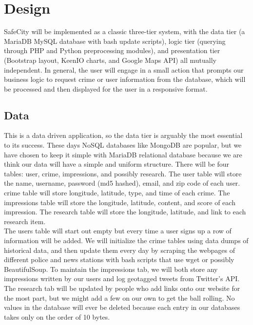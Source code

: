 \documentclass[paper=a4, fontsize=11pt]{scrartcl} %
\numberwithin{equation}{section} %
\numberwithin{figure}{section} %
\numberwithin{table}{section} %
\begin{document}

\section{Design}

SafeCity will be implemented as a classic three-tier system, with the data tier (a MariaDB MySQL database with bash update scripts), logic tier (querying through PHP and Python preprocessing modules), and presentation tier (Bootstrap layout, KeenIO charts, and Google Maps API) all mutually independent. In general, the user will engage in a small action that prompts our business logic to request crime or user information from the database, which will be processed and then displayed for the user in a responsive format. \\


\subsection{Data}

This is a data driven application, so the data tier is arguably the most essential to its success. These days NoSQL databases like MongoDB are popular, but we have chosen to keep it simple with MariaDB relational database because we are think our data will have a simple and uniform structure. There will be four tables: user, crime, impressions, and possibly research. The user table will store the name, username, password (md5 hashed), email, and zip code of each user. crime table will store longitude, latitude, type, and time of each crime. The impressions table will store the longitude, latitude, content, and score of each impression. The research table will store the longitude, latitude, and link to each research item. \\

The users table will start out empty but every time a user signs up a row of information will be added. We will initialize the crime tables using data dumps of historical data, and then update them every day by scraping the webpages of different police and news stations with bash scripts that use wget or possibly BeautifulSoup. To maintain the impressions tab, we will both store any impressions written by our users and log geotagged tweets from Twitter's API. The research tab will be updated by people who add links onto our website for the most part, but we might add a few on our own to get the ball rolling. No values in the database will ever be deleted because each entry in our databases takes only on the order of 10 bytes.
\end{document}
